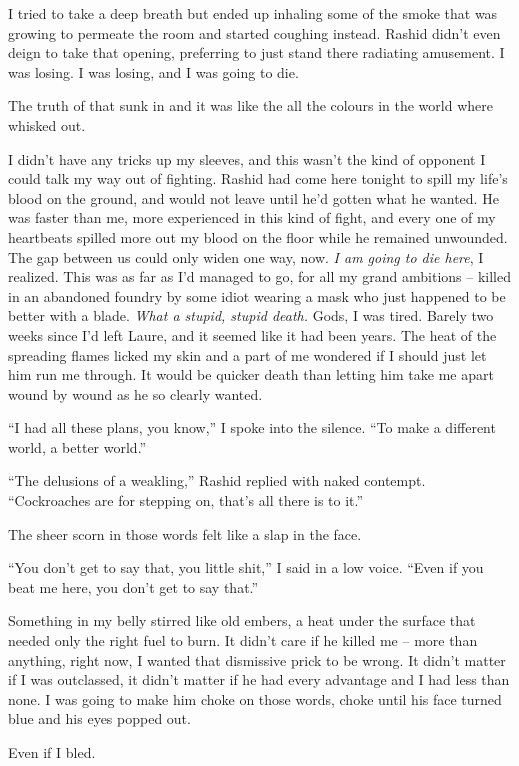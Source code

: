 \documentclass[12pt, openany]{book}
\begin{document}
I tried to take a deep breath but ended up inhaling some of the smoke that was growing to permeate the room and started coughing instead. Rashid didn’t even deign to take that opening, preferring to just stand there radiating amusement. I was losing. I was losing, and I was going to die.

The truth of that sunk in and it was like the all the colours in the world where whisked out.

I didn’t have any tricks up my sleeves, and this wasn’t the kind of opponent I could talk my way out of fighting. Rashid had come here tonight to spill my life’s blood on the ground, and would not leave until he’d gotten what he wanted. He was faster than me, more experienced in this kind of fight, and every one of my heartbeats spilled more out my blood on the floor while he remained unwounded. The gap between us could only widen one way, now. \textit{I am going to die here}, I realized. This was as far as I’d managed to go, for all my grand ambitions – killed in an abandoned foundry by some idiot wearing a mask who just happened to be better with a blade. \textit{What a stupid, stupid death. }Gods, I was tired. Barely two weeks since I’d left Laure, and it seemed like it had been years. The heat of the spreading flames licked my skin and a part of me wondered if I should just let him run me through. It would be quicker death than letting him take me apart wound by wound as he so clearly wanted. 

“I had all these plans, you know,” I spoke into the silence. “To make a different world, a better world.”

“The delusions of a weakling,” Rashid replied with naked contempt. “Cockroaches are for stepping on, that’s all there is to it.”

The sheer scorn in those words felt like a slap in the face. 

“You don’t get to say that, you little shit,” I said in a low voice. “Even if you beat me here, you don’t get to say that.”

Something in my belly stirred like old embers, a heat under the surface that needed only the right fuel to burn. It didn’t care if he killed me – more than anything, right now, I wanted that dismissive prick to be wrong. It didn’t matter if I was outclassed, it didn’t matter if he had every advantage and I had less than none. I was going to make him choke on those words, choke until his face turned blue and his eyes popped out. 

Even if I bled. 
\end{document}
